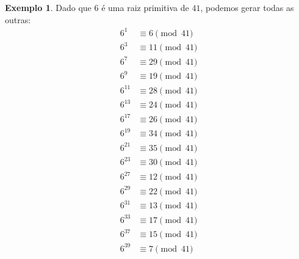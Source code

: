 \documentclass{article}
\theoremstyle{definition}
\newtheorem{example}{Exemplo}
\begin{document}
\begin{example}
    Dado que $6$ é uma raiz primitiva de $41$,
    podemos gerar todas as outras:
    \begin{align*}
        6^1 &\equiv 6 \pmod{41} \\
        6^3 &\equiv 11 \pmod{41} \\
        6^7 &\equiv 29 \pmod{41} \\
        6^9 &\equiv 19 \pmod{41} \\
        6^{11} &\equiv 28 \pmod{41} \\
        6^{13} &\equiv 24 \pmod{41} \\
        6^{17} &\equiv 26 \pmod{41} \\
        6^{19} &\equiv 34 \pmod{41} \\
        6^{21} &\equiv 35 \pmod{41} \\
        6^{23} &\equiv 30 \pmod{41} \\
        6^{27} &\equiv 12 \pmod{41} \\
        6^{29} &\equiv 22 \pmod{41} \\
        6^{31} &\equiv 13 \pmod{41} \\
        6^{33} &\equiv 17 \pmod{41} \\
        6^{37} &\equiv 15 \pmod{41} \\
        6^{39} &\equiv 7 \pmod{41}
    \end{align*}
\end{example}



\end{document}
